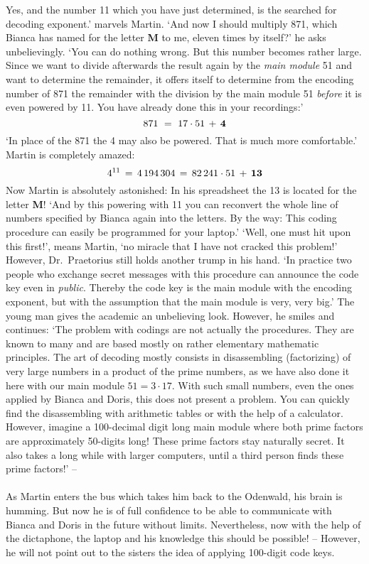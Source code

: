 Yes, and the number 11 which you have just determined, is the searched for decoding exponent.' marvels Martin. 
`And now I should multiply 871, which Bianca has named for the letter {\bf M} to me, eleven times by 
itself?' he asks unbelievingly.
`You can do nothing wrong. 
But this number becomes rather large. 
Since we want to divide afterwards the result again by the {\em main module \/} 51 and want to determine 
the remainder, it offers itself to determine from the encoding number of 871 the remainder with the division 
by the main module 51 {\em before \/} it is even powered by 11. 
You have already done this in your recordings:' 
\[
871\, \, =\, \, 17\cdot 51\, +\, {\bf 4} 
\] 
`In place of the 871 the 4 may also be powered. 
That is much more comfortable.' Martin is completely amazed: 
\[
4^{11}\, =\, 4\,194\,304\, =\, 82\,241\cdot 51\, +\, {\bf 13} 
\] 
Now Martin is absolutely astonished: In his spreadsheet the 13 is located for the letter {\bf M}! 
`And by this powering with 11 you can reconvert the whole line of numbers specified by Bianca again into the letters. 
By the way: This coding procedure can easily be programmed for your laptop.' 
`Well, one must hit upon this first!', means Martin, `no miracle that I have not cracked this problem!' 
However, Dr.~Praetorius still holds another trump in his hand. 
`In practice two people who exchange secret messages with this procedure can announce the code key even in 
{\em public\/}. 
Thereby the code key is the main module with the encoding exponent, but with the assumption that the main 
module is very, very big.'
The young man gives the academic an unbelieving look. 
However, he smiles and continues: 
`The problem with codings are not actually the procedures. 
They are known to many and are based mostly on rather elementary mathematic principles. 
The art of decoding mostly consists in disassembling (factorizing) of very large numbers in a product of 
the prime numbers, as we have also done it here with our main module \(51=3\cdot 17 \). 
With such small numbers, even the ones applied by Bianca and Doris, this does not present a problem.
You can quickly find the disassembling with arithmetic tables or with the help of a calculator. 
However, imagine a 100-decimal digit long main module where both prime factors are approximately 50-digits long! 
These prime factors stay naturally secret. 
It also takes a long while with larger computers, until a third person finds these prime factors!' -- \\ \\ 
As Martin enters the bus which takes him back to the Odenwald, his brain is humming.
But now he is of full confidence to be able to communicate with Bianca and Doris in the future without limits. 
Nevertheless, now with the help of the dictaphone, the laptop and his knowledge this should be possible! 
-- However, he will not point out to the sisters the idea of applying 100-digit code keys.


